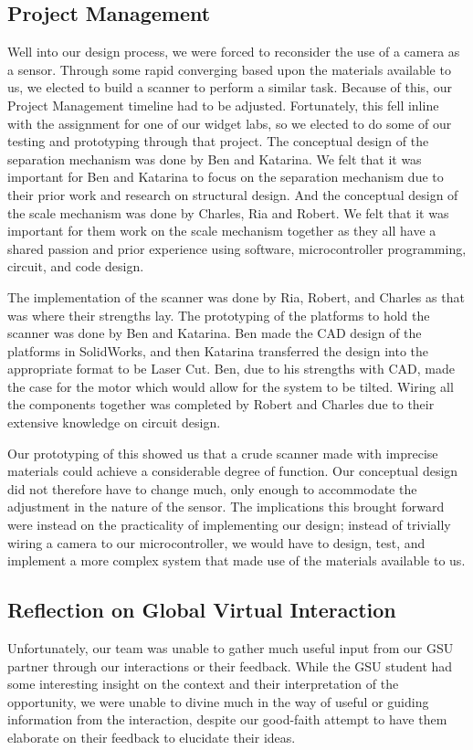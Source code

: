 \documentclass[12pt]{article}
\begin{document}
\begin{multicols*}{2}
        \subsection{Project Management}

        Well into our design process, we were forced to reconsider the use of a camera as a sensor. Through some rapid converging based upon the materials available to us, we elected to build a scanner to perform a similar task. Because of this, our Project Management timeline had to be adjusted. Fortunately, this fell inline with the assignment for one of our widget labs, so we elected to do some of our testing and prototyping through that project. The conceptual design of the separation mechanism was done by Ben and Katarina. We felt that it was important for Ben and Katarina to focus on the separation mechanism due to their prior work and research on structural design. And the conceptual design of the scale mechanism was done by Charles, Ria and Robert. We felt that it was important for them work on the scale mechanism together as they all have a shared passion and prior experience using software, microcontroller programming, circuit, and code design. 
        
        The implementation of the scanner was done by Ria, Robert, and Charles as that was where their strengths lay. The prototyping of the platforms to hold the scanner was done by Ben and Katarina. Ben made the CAD design of the platforms in SolidWorks, and then Katarina transferred the design into the appropriate format to be Laser Cut. Ben, due to his strengths with CAD, made the case for the motor which would allow for the system to be tilted. Wiring all the components together was completed by Robert and Charles due to their extensive knowledge on circuit design. 

        Our prototyping of this showed us that a crude scanner made with imprecise materials could achieve a considerable degree of function. Our conceptual design did not therefore have to change much, only enough to accommodate the adjustment in the nature of the sensor. The implications this brought forward were instead on the practicality of implementing our design; instead of trivially wiring a camera to our microcontroller, we would have to design, test, and implement a more complex system that made use of the materials available to us.
            
        \subsection{Reflection on Global Virtual Interaction}
            Unfortunately, our team was unable to gather much useful input from our GSU partner through our interactions or their feedback. While the GSU student had some interesting insight on the context and their interpretation of the opportunity, we were unable to divine much in the way of useful or guiding information from the interaction, despite our good-faith attempt to have them elaborate on their feedback to elucidate their ideas. 


\end{multicols*}
\end{document}

